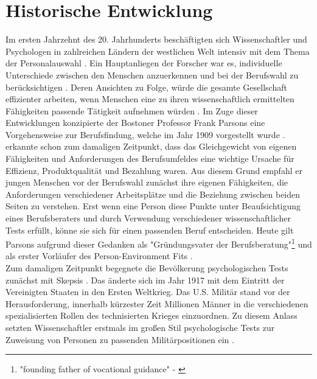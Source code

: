 \section{Historische Entwicklung}
\label{ch:personEnvironmentFit:historisches}
Im ersten Jahrzehnt des 20. Jahrhunderts beschäftigten sich Wissenschaftler und Psychologen in zahlreichen Ländern der westlichen Welt intensiv mit dem Thema der Personalauswahl \cite[S. 1]{salgado:2001}. Ein Hauptanliegen der Forscher war es, individuelle Unterschiede zwischen den Menschen anzuerkennen und bei der Berufswahl zu berücksichtigen \cite[S. 2ff.]{stern:1900}. Deren Ansichten zu Folge, würde die gesamte Gesellschaft effizienter arbeiten, wenn Menschen eine zu ihren wissenschaftlich ermittelten Fähigkeiten passende Tätigkeit aufnehmen würden \cite[S.2]{kevles:1968}\cite[S. 3]{parsons:1909}. Im Zuge dieser Entwicklungen konzipierte der Bostoner Professor Frank Parsons eine Vorgehensweise zur Berufsfindung, welche im Jahr 1909 vorgestellt wurde \cite[S. 1]{su:2015}. \textcite[S. 5ff.]{parsons:1909} erkannte schon zum damaligen Zeitpunkt, dass das Gleichgewicht von eigenen Fähigkeiten und Anforderungen des Berufsumfeldes eine wichtige Ursache für Effizienz, Produktqualität und Bezahlung waren. Aus diesem Grund empfahl er jungen Menschen vor der Berufswahl zunächst ihre eigenen Fähigkeiten, die Anforderungen verschiedener Arbeitsplätze und die Beziehung zwischen beiden Seiten zu verstehen. Erst wenn eine Person diese Punkte unter Beaufsichtigung eines Berufsberaters und durch Verwendung verschiedener wissenschaftlicher Tests erfüllt, könne sie sich für einen passenden Beruf entscheiden. Heute gilt Parsons aufgrund dieser Gedanken als "Gründungsvater der Berufsberatung"\footnote{"founding father of vocational guidance" - \textcite[S. 3]{porfeli:2009}} \cite[S. 3]{porfeli:2009} und als erster Vorläufer des Person-Environment Fits \cite[S. 2]{edwards:2008}.\\
Zum damaligen Zeitpunkt begegnete die Bevölkerung psychologischen Tests zunächst mit Skepsis \cite[S. 2]{kevles:1968}. Das änderte sich im Jahr 1917 mit dem Eintritt der Vereinigten Staaten in den Ersten Weltkrieg. Das U.S. Militär stand vor der Herausforderung, innerhalb kürzester Zeit Millionen Männer in die verschiedenen spezialisierten Rollen des technisierten Krieges einzuordnen. Zu diesem Anlass setzten Wissenschaftler erstmals im großen Stil psychologische Tests zur Zuweisung von Personen zu passenden Militärpositionen ein \cite[S. 2ff.]{kevles:1968}. \\
